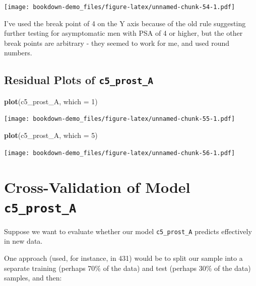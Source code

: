 \documentclass[]{book}
\newenvironment{Shaded}{\begin{snugshade}}{\end{snugshade}}
\newcommand{\KeywordTok}[1]{\textcolor[rgb]{0.13,0.29,0.53}{\textbf{#1}}}
\newcommand{\DataTypeTok}[1]{\textcolor[rgb]{0.13,0.29,0.53}{#1}}
\newcommand{\DecValTok}[1]{\textcolor[rgb]{0.00,0.00,0.81}{#1}}
\newcommand{\NormalTok}[1]{#1}
\theoremstyle{definition}
\theoremstyle{definition}
\theoremstyle{definition}
\theoremstyle{remark}
\begin{document}
\texttt{[image: bookdown-demo\_files/figure-latex/unnamed-chunk-54-1.pdf]}

I've used the break point of 4 on the Y axis because of the old rule
suggesting further testing for asymptomatic men with PSA of 4 or higher,
but the other break points are arbitrary - they seemed to work for me,
and used round numbers.

\subsection{\texorpdfstring{Residual Plots of
\texttt{c5\_prost\_A}}{Residual Plots of c5\_prost\_A}}\label{residual-plots-of-c5_prost_a}

\begin{Shaded}
\begin{Highlighting}[]
\KeywordTok{plot}\NormalTok{(c5_prost_A, }\DataTypeTok{which =} \DecValTok{1}\NormalTok{)}
\end{Highlighting}
\end{Shaded}

\texttt{[image: bookdown-demo\_files/figure-latex/unnamed-chunk-55-1.pdf]}

\begin{Shaded}
\begin{Highlighting}[]
\KeywordTok{plot}\NormalTok{(c5_prost_A, }\DataTypeTok{which =} \DecValTok{5}\NormalTok{)}
\end{Highlighting}
\end{Shaded}

\texttt{[image: bookdown-demo\_files/figure-latex/unnamed-chunk-56-1.pdf]}

\section{\texorpdfstring{Cross-Validation of Model
\texttt{c5\_prost\_A}}{Cross-Validation of Model c5\_prost\_A}}\label{cross-validation-of-model-c5_prost_a}

Suppose we want to evaluate whether our model \texttt{c5\_prost\_A}
predicts effectively in new data.

One approach (used, for instance, in 431) would be to split our sample
into a separate training (perhaps 70\% of the data) and test (perhaps
30\% of the data) samples, and then:
\end{document}
